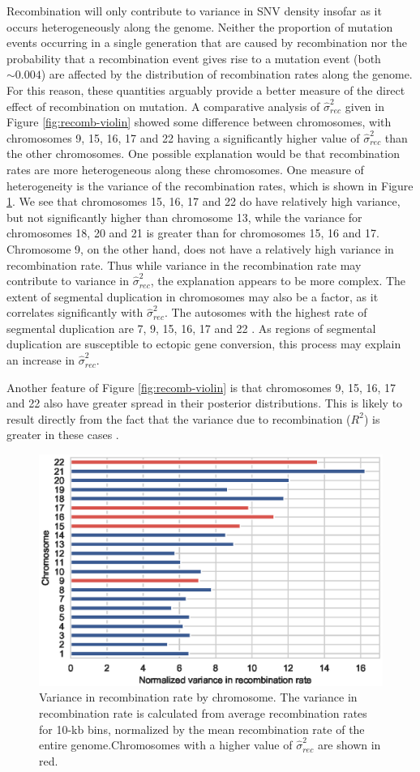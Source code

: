 Recombination will only contribute to variance in SNV density insofar as it occurs heterogeneously along the genome. Neither the proportion of mutation events occurring in a single generation that are caused by recombination nor the probability that a recombination event gives rise to a mutation event (both $\sim0.004$) are affected by the distribution of recombination rates along the genome. For this reason, these quantities arguably provide a better measure of the direct effect of recombination on mutation.  A comparative analysis of $\hat{\sigma }^2_{rec}$ given in Figure \ref{fig:recomb-violin} showed some difference between chromosomes, with chromosomes 9, 15, 16, 17 and 22 having a significantly higher value of $\hat{\sigma }^2_{rec}$ than the other chromosomes. One possible explanation would be that recombination rates are more heterogeneous along these chromosomes. One measure of heterogeneity is the variance of the recombination rates, which is shown in Figure \ref{fig:rcomb-bar}. We see that chromosomes 15, 16, 17 and 22 do have relatively high variance, but not significantly higher than chromosome 13, while the variance for chromosomes 18, 20 and 21 is greater than for chromosomes 15, 16 and 17. Chromosome 9, on the other hand, does not have a relatively high variance in recombination rate. Thus while variance in the recombination rate may contribute to variance in $\hat{\sigma }^2_{rec}$, the explanation appears to be more complex. The extent of segmental duplication in chromosomes may also be a factor, as it correlates significantly with $\hat{\sigma }^2_{rec}$. The autosomes with the highest rate of segmental duplication are 7, 9, 15, 16, 17 and  22 \citep{zhang2004}. As regions of segmental duplication are susceptible to ectopic gene conversion, this process may explain an increase in $\hat{\sigma }^2_{rec}$.

Another feature of Figure \ref{fig:recomb-violin} is that chromosomes 9, 15, 16, 17 and 22 also have greater spread in their posterior distributions. This is likely to result directly from the fact that the variance due to recombination ($R^2$) is greater in these cases \citep{wishart1931mean, olkin1995correlations}. 

\begin{figure}[h!]
\begin{center}
\includegraphics[width=0.5\columnwidth]{figs/recomb_bar_plot.eps}
\caption{Variance in recombination rate by chromosome. The variance in recombination rate is calculated from average recombination rates for 10-kb bins, normalized by the mean recombination rate of the entire genome.Chromosomes with a higher value of $\hat{\sigma }^2_{rec}$ are shown in red.}
\label{fig:rcomb-bar}
\end{center}
\end{figure}
 

